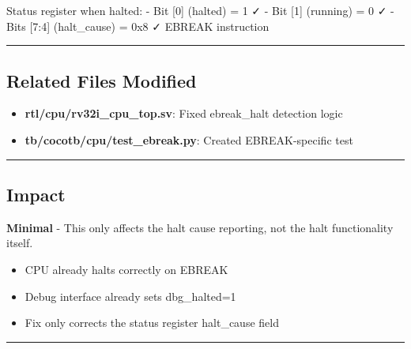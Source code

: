 \begin{record}

\begin{textblock}
Status register when halted:
  - Bit [0] (halted)  = 1 ✓
  - Bit [1] (running) = 0 ✓
  - Bits [7:4] (halt_cause) = 0x8 ✓ EBREAK instruction
\end{textblock}

\begin{center}\rule{0.5\linewidth}{0.5pt}\end{center}

\end{record}

\subsection{Related Files Modified}\label{cr:fix:ebreak-bug-fix:related-files-modified}

\begin{record}

\begin{itemize}
\tightlist
\item
  \textbf{rtl/\allowbreak{}cpu/\allowbreak{}rv32i\_\allowbreak{}cpu\_\allowbreak{}top.sv}:
  Fixed ebreak\_\allowbreak{}halt detection logic
\item
  \textbf{tb/\allowbreak{}cocotb/\allowbreak{}cpu/\allowbreak{}test\_\allowbreak{}ebreak.py}:
  Created EBREAK-specific test
\end{itemize}

\begin{center}\rule{0.5\linewidth}{0.5pt}\end{center}

\end{record}

\subsection{Impact}\label{cr:fix:ebreak-bug-fix:impact}

\begin{record}

\textbf{Minimal} - This only affects the halt cause reporting, not the
halt functionality itself.

\begin{itemize}
\tightlist
\item
  \ok{} CPU already halts correctly on EBREAK
\item
  \ok{} Debug interface already sets dbg\_\allowbreak{}halted=1
\item
  \ok{} Fix only corrects the status register halt\_\allowbreak{}cause
  field
\end{itemize}

\begin{center}\rule{0.5\linewidth}{0.5pt}\end{center}

\end{record}

